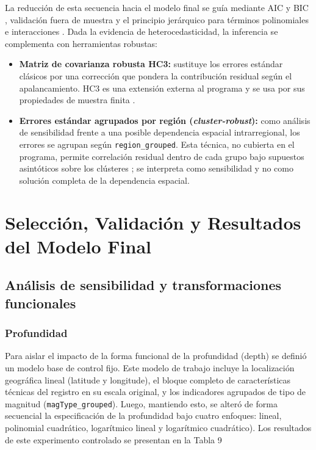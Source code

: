 \documentclass{style}
\newcommand{\var}[1]{\texttt{#1}}
\begin{document}
La reducción de esta secuencia hacia el modelo final se guía mediante AIC y BIC \cite{akaike1974,schwarz1978}, validación fuera de muestra y el principio jerárquico para términos polinomiales e interacciones \cite{montgomery2021}. Dada la evidencia de heterocedasticidad, la inferencia se complementa con herramientas robustas:

\begin{itemize}
    \item \textbf{Matriz de covarianza robusta HC3:} sustituye los errores estándar clásicos por una corrección que pondera la contribución residual según el apalancamiento. HC3 es una extensión externa al programa y se usa por sus propiedades de muestra finita \cite{mackinnonwhite1985}.

    \item \textbf{Errores estándar agrupados por región (\textit{cluster-robust}):} como análisis de sensibilidad frente a una posible dependencia espacial intrarregional, los errores se agrupan según \var{region\_grouped}. Esta técnica, no cubierta en el programa, permite correlación residual dentro de cada grupo bajo supuestos asintóticos sobre los clústeres \cite{cameronmiller2015}; se interpreta como sensibilidad y no como solución completa de la dependencia espacial.
\end{itemize}



\section{Selección, Validación y Resultados del Modelo Final}

\subsection{Análisis de sensibilidad y transformaciones funcionales}


\subsubsection{Profundidad}

Para aislar el impacto de la forma funcional de la profundidad (depth) se definió un modelo base de control fijo. Este modelo de trabajo incluye la localización geográfica lineal (latitude y longitude), el bloque completo de características técnicas del registro en su escala original, y los indicadores agrupados de tipo de magnitud (\var{magType\_grouped}). Luego, mantiendo esto, se alteró de forma secuencial la especificación de la profundidad bajo cuatro enfoques: lineal, polinomial cuadrático, logarítmico lineal y logarítmico cuadrático). Los resultados de este experimento controlado se presentan en la Tabla 9
\end{document}
